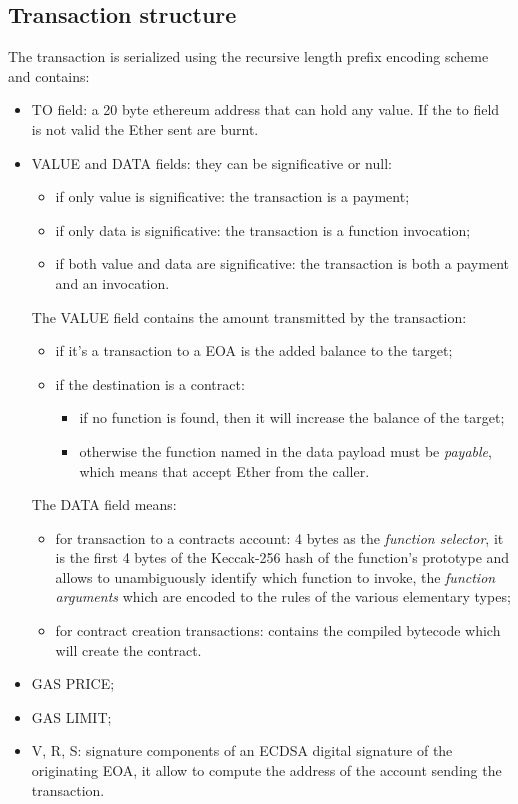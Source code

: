 \subsection{Transaction structure}
The transaction is serialized using the recursive length prefix encoding scheme and contains:
\begin{itemize}
    \item TO field: a 20 byte ethereum address that can hold any value.
    If the to field is not valid the Ether sent are burnt.

    \item VALUE and DATA fields: they can be significative or null:
    \begin{itemize}
        \item if only value is significative: the transaction is a payment;
        \item if only data is significative: the transaction is a function invocation;
        \item if both value and data are significative: the transaction is both a payment and an invocation.
    \end{itemize}
    The VALUE field contains the amount transmitted by the transaction:
    \begin{itemize}
        \item if it's a transaction to a EOA is the added balance to the target;
        \item if the destination is a contract:
        \begin{itemize}
            \item if no function is found, then it will increase the balance of the target;
            \item otherwise the function named in the data payload must be \emph{payable}, which means that accept Ether from the caller.
        \end{itemize}
    \end{itemize}
    The DATA field means:
    \begin{itemize}
        \item for transaction to a contracts account: 4 bytes as the \emph{function selector}, it is the first 4 bytes of the Keccak-256 hash of the function's prototype and allows to unambiguously identify which function to invoke, the \emph{function arguments} which are encoded to the rules of the various elementary types;

        \item for contract creation transactions: contains the compiled bytecode which will create the contract.
    \end{itemize}

    \item GAS PRICE;
    \item GAS LIMIT;
    \item V, R, S: signature components of an ECDSA digital signature of the originating EOA, it allow to compute the address of the account sending the transaction.
\end{itemize}

